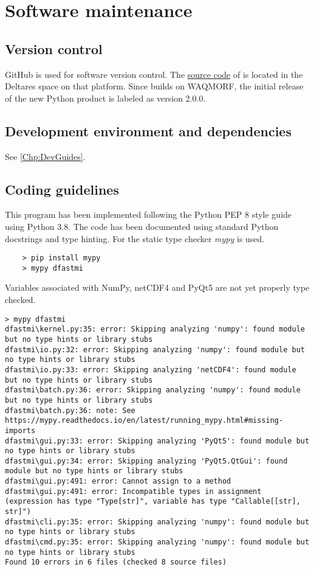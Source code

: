 \chapter{Software maintenance}

\section{Version control}

GitHub is used for software version control.
The \href{https://github.com/Deltares/D-FAST_Morphological_Impact}{source code} of \dfastmi is located in the Deltares space on that platform.
Since \dfastmi builds on WAQMORF, the initial release of the new Python product is labeled as version 2.0.0.

\section{Development environment and dependencies}

See \autoref{Chp:DevGuides}.

\section{Coding guidelines}

This program has been implemented following the Python PEP 8 style guide using Python 3.8.
The code has been documented using standard Python docstrings and type hinting.
For the static type checker \emph{mypy} is used.

\begin{Verbatim}
    > pip install mypy
    > mypy dfastmi
\end{Verbatim}

Variables associated with NumPy, netCDF4 and PyQt5 are not yet properly type checked.

\begin{Verbatim}[fontsize=\tiny]
> mypy dfastmi
dfastmi\kernel.py:35: error: Skipping analyzing 'numpy': found module but no type hints or library stubs
dfastmi\io.py:32: error: Skipping analyzing 'numpy': found module but no type hints or library stubs
dfastmi\io.py:33: error: Skipping analyzing 'netCDF4': found module but no type hints or library stubs
dfastmi\batch.py:36: error: Skipping analyzing 'numpy': found module but no type hints or library stubs
dfastmi\batch.py:36: note: See https://mypy.readthedocs.io/en/latest/running_mypy.html#missing-imports
dfastmi\gui.py:33: error: Skipping analyzing 'PyQt5': found module but no type hints or library stubs
dfastmi\gui.py:34: error: Skipping analyzing 'PyQt5.QtGui': found module but no type hints or library stubs
dfastmi\gui.py:491: error: Cannot assign to a method
dfastmi\gui.py:491: error: Incompatible types in assignment (expression has type "Type[str]", variable has type "Callable[[str], str]")
dfastmi\cli.py:35: error: Skipping analyzing 'numpy': found module but no type hints or library stubs
dfastmi\cmd.py:35: error: Skipping analyzing 'numpy': found module but no type hints or library stubs
Found 10 errors in 6 files (checked 8 source files)
\end{Verbatim}

